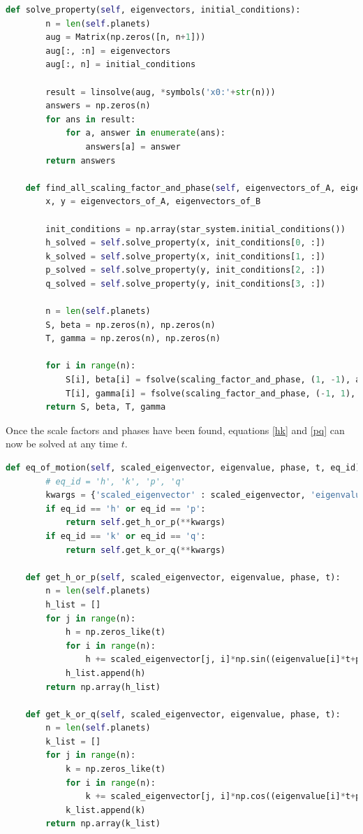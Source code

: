 \documentclass[11pt, oneside]{article}   	%
\begin{document}
\begin{lstlisting}[language=Python, caption={Calculating the scale factors and phases}, firstnumber=73, label=s_phase]
    def solve_property(self, eigenvectors, initial_conditions):
        n = len(self.planets)
        aug = Matrix(np.zeros([n, n+1]))
        aug[:, :n] = eigenvectors
        aug[:, n] = initial_conditions

        result = linsolve(aug, *symbols('x0:'+str(n)))
        answers = np.zeros(n)
        for ans in result:
            for a, answer in enumerate(ans):
                answers[a] = answer
        return answers

    def find_all_scaling_factor_and_phase(self, eigenvectors_of_A, eigenvectors_of_B):
        x, y = eigenvectors_of_A, eigenvectors_of_B

        init_conditions = np.array(star_system.initial_conditions())
        h_solved = self.solve_property(x, init_conditions[0, :])
        k_solved = self.solve_property(x, init_conditions[1, :])
        p_solved = self.solve_property(y, init_conditions[2, :])
        q_solved = self.solve_property(y, init_conditions[3, :])

        n = len(self.planets)
        S, beta = np.zeros(n), np.zeros(n)
        T, gamma = np.zeros(n), np.zeros(n)

        for i in range(n):
            S[i], beta[i] = fsolve(scaling_factor_and_phase, (1, -1), args=(h_solved[i], k_solved[i],))
            T[i], gamma[i] = fsolve(scaling_factor_and_phase, (-1, 1), args=(p_solved[i], q_solved[i],))
        return S, beta, T, gamma
\end{lstlisting}

Once the scale factors and phases have been found, equations \ref{hk} and \ref{pq} can now be solved at any time $t$.

\begin{lstlisting}[language=Python, caption={Calculating the equations of motion}, firstnumber=103]
    def eq_of_motion(self, scaled_eigenvector, eigenvalue, phase, t, eq_id):
        # eq_id = 'h', 'k', 'p', 'q'
        kwargs = {'scaled_eigenvector' : scaled_eigenvector, 'eigenvalue' : eigenvalue, 'phase' : phase, 't' : t}
        if eq_id == 'h' or eq_id == 'p':
            return self.get_h_or_p(**kwargs)
        if eq_id == 'k' or eq_id == 'q':
            return self.get_k_or_q(**kwargs)
    
    def get_h_or_p(self, scaled_eigenvector, eigenvalue, phase, t):
        n = len(self.planets)
        h_list = []
        for j in range(n):
            h = np.zeros_like(t)
            for i in range(n):
                h += scaled_eigenvector[j, i]*np.sin((eigenvalue[i]*t+phase[i])*np.pi/180)
            h_list.append(h)
        return np.array(h_list)

    def get_k_or_q(self, scaled_eigenvector, eigenvalue, phase, t):
        n = len(self.planets)
        k_list = []
        for j in range(n):
            k = np.zeros_like(t)
            for i in range(n):
                k += scaled_eigenvector[j, i]*np.cos((eigenvalue[i]*t+phase[i])*np.pi/180)
            k_list.append(k)
        return np.array(k_list)
\end{lstlisting}
\end{document}
